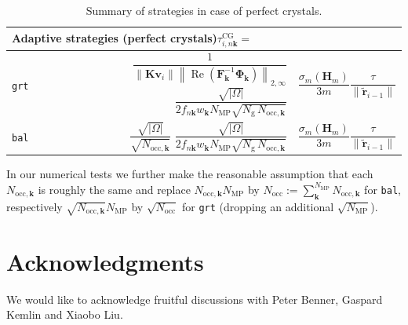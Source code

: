 \documentclass[hidelinks,onefignum,onetabnum]{siamart250211}
\newcommand{\Real}{\operatorname{Re}}
\newcommand{\Nocc}{N_{\mathrm{occ}}}
\newcommand{\Nocck}{N_{\mathrm{occ},\bm{k}}}
\newcommand{\Ng}{N_{\mathrm{g}}}
\newcommand{\taucg}{\tau^{\mathrm{CG}}}
\newcommand{\Nmp}{N_{\text{MP}}}
\newcommand{\sbal}{\texttt{bal}\xspace}
\newcommand{\sgrt}{\texttt{grt}\xspace}
\begin{document}
\begin{table}
  \newcommand{\rhsterm}{$\dfrac{\sigma_m(\bm H_m)}{3m} \dfrac{ \tau}{\|\widetilde{\bm r}_{i-1}\|}$}
  \centering
  \smaller
  \begin{tabular}{crl}
    \toprule
    \multicolumn{3}{l}{Adaptive strategies (perfect crystals)\quad$\taucg_{i,n\bm k} = $} \\
    \midrule
    \sgrt     & $ \dfrac{1}{\left\| \bm K \bm v_i \right\| \left\| \Real(\bm{F}_{\bm k}^{-1}\bm{\Phi}_{\bm k}) \right\|_{2,\infty}}$
                $ \dfrac{\sqrt{|\Omega|}}{2 f_{n\bm k} w_{\bm k} \Nmp \sqrt{\Ng \, \Nocck}}$
                & \rhsterm \\[0.2em]
    \sbal     & $ \dfrac{\sqrt{|\Omega|}}{\sqrt{\Nocck}}$
    $ \dfrac{\sqrt{|\Omega|}}{2 f_{n\bm k} w_{\bm k} \Nmp \sqrt{\Ng \, \Nocck}}$
    & \rhsterm \\[0.2em]
    \bottomrule
  \end{tabular}
  \caption{Summary of strategies in case of perfect crystals.}
  \label{tab:strategies_k}
\end{table}

In our numerical tests we further make the reasonable assumption
that each $\Nocck$ is roughly the same and replace
$\Nocck \Nmp$ by $\Nocc := \sum_{\bm k}^{\Nmp} \Nocck$ for \sbal,
respectively 
$\sqrt{\Nocck} \Nmp$ by $\sqrt{\Nocc}$ for \sgrt
(dropping an additional $\sqrt{\Nmp}$).

%
%
%
%
%
%
%
%
%
%
%
%
%
%
%
%
%
%
%
%
%
%

%
%
%
%
%

%
%
%
%
%
%


\fi

%
%
%

\section*{Acknowledgments}
We would like to acknowledge fruitful discussions with Peter Benner,
Gaspard Kemlin and Xiaobo Liu.

%
%


\end{document}
